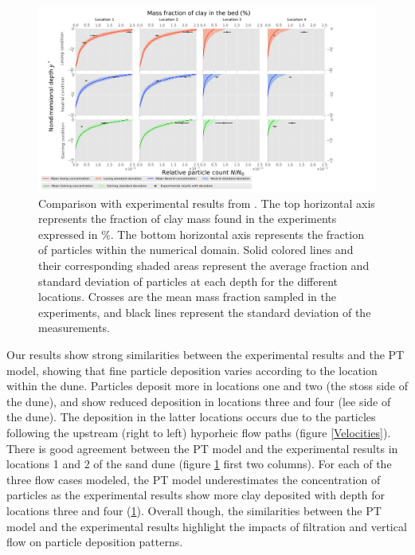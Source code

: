 \documentclass[draft,linenumbers]{agujournal2018}
\begin{document}
\begin{figure}
\centering
\includegraphics[trim=0.2cm 0.2cm 0.2cm 0.2cm, width=65pc]
{190131_Comparing.pdf}
\caption{Comparison with experimental results from \citep{Fox2018}. The top horizontal axis represents the fraction of clay mass found in the experiments expressed in $\%$. The bottom horizontal axis represents the fraction of particles within the numerical domain. Solid colored lines and their corresponding shaded areas represent the average fraction and standard deviation of particles at each depth for the different locations. Crosses are the mean mass fraction sampled in the experiments, and black lines represent the standard deviation of the measurements.}
\label{Comparison}
\end{figure}

Our results show strong similarities between the experimental results and the PT model, showing that fine particle deposition varies according to the location within the dune. Particles deposit more in locations one and two (the stoss side of the dune), and show reduced deposition in locations three and four (lee side of the dune). The deposition in the latter locations occurs due to the particles following the upstream (right to left) hyporheic flow paths (figure \ref{Velocities}). There is good agreement between the PT model and the experimental results in locations 1 and 2 of the sand dune (figure \ref{Comparison} first two columns). For each of the three flow cases modeled, the PT model underestimates the concentration of particles as the experimental results show more clay deposited with depth for locations three and four (\ref{Comparison}). Overall though, the similarities between the PT model and the experimental results highlight the impacts of filtration and vertical flow on particle deposition patterns. 
\end{document}
